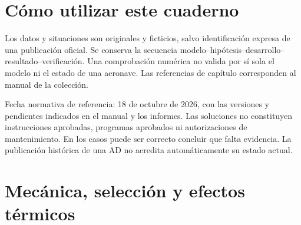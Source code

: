 
\frontmatter
{}
\chapter*{Cómo utilizar este cuaderno}
Los datos y situaciones son originales y ficticios, salvo identificación expresa de una publicación oficial. Se conserva la secuencia modelo--hipótesis--desarrollo--resultado--verificación. Una comprobación numérica no valida por sí sola el modelo ni el estado de una aeronave. Las referencias de capítulo corresponden al manual de la colección.

Fecha normativa de referencia: 18 de octubre de 2026, con las versiones y pendientes indicados en el manual y los informes. Las soluciones no constituyen instrucciones aprobadas, programas aprobados ni autorizaciones de mantenimiento. En los casos puede ser correcto concluir que falta evidencia. La publicación histórica de una AD no acredita automáticamente su estado actual.
\bigskip\creditosportada
\tableofcontents\mainmatter
\chapter{Mecánica, selección y efectos térmicos}
